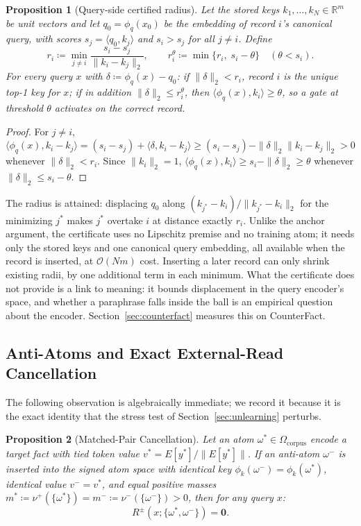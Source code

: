 \documentclass[preprint,12pt]{elsarticle}
\newtheorem{proposition}{Proposition}
\newcommand{\R}{\mathbb{R}}
\newcommand{\Om}{\Omega}
\newif\ifmarkchanges
\newcommand{\rev}[1]{\ifmarkchanges{\color{blue}#1}\else#1\fi}
\begin{document}
\begin{proposition}[Query-side certified radius]
\label{prop:query_radius}
\rev{Let the stored keys $k_1,\dots,k_N\in\R^m$ be unit vectors and let $q_0=\phi_q(x_0)$ be the embedding of record $i$'s canonical query, with scores $s_j=\langle q_0,k_j\rangle$ and $s_i>s_j$ for all $j\ne i$. Define
\[
  r_i \coloneqq \min_{j\ne i}\frac{s_i-s_j}{\|k_i-k_j\|_2}, \qquad r_i^{\theta}\coloneqq\min\{r_i,\; s_i-\theta\}\quad(\theta<s_i).
\]
For every query $x$ with $\delta\coloneqq\phi_q(x)-q_0$: if $\|\delta\|_2<r_i$, record $i$ is the unique top-1 key for $x$; if in addition $\|\delta\|_2\le r_i^{\theta}$, then $\langle\phi_q(x),k_i\rangle\ge\theta$, so a gate at threshold $\theta$ activates on the correct record.}
\end{proposition}

\begin{proof}
\rev{For $j\ne i$, $\langle\phi_q(x),k_i-k_j\rangle=(s_i-s_j)+\langle\delta,k_i-k_j\rangle\ge(s_i-s_j)-\|\delta\|_2\|k_i-k_j\|_2>0$ whenever $\|\delta\|_2<r_i$. Since $\|k_i\|_2=1$, $\langle\phi_q(x),k_i\rangle\ge s_i-\|\delta\|_2\ge\theta$ whenever $\|\delta\|_2\le s_i-\theta$.} \qedhere
\end{proof}

\rev{The radius is attained: displacing $q_0$ along $(k_{j^*}-k_i)/\|k_{j^*}-k_i\|_2$ for the minimizing $j^*$ makes $j^*$ overtake $i$ at distance exactly $r_i$. Unlike the anchor argument, the certificate uses no Lipschitz premise and no training atom; it needs only the stored keys and one canonical query embedding, all available when the record is inserted, at $\mathcal O(Nm)$ cost. Inserting a later record can only shrink existing radii, by one additional term in each minimum. What the certificate does not provide is a link to meaning: it bounds displacement in the query encoder's space, and whether a paraphrase falls inside the ball is an empirical question about the encoder. Section~\ref{sec:counterfact} measures this on CounterFact.}

\subsection{Anti-Atoms and Exact External-Read Cancellation}

The following observation is algebraically immediate; we record it because it is the exact identity that the stress test of Section~\ref{sec:unlearning} perturbs.

\begin{proposition}[Matched-Pair Cancellation]
\label{prop:unlearning}
Let an atom $\omega^* \in \Om_{\mathrm{corpus}}$ encode a target fact with tied token value $v^* = E[y^*] / \|E[y^*]\|$. If an anti-atom $\omega^-$ is inserted into the signed atom space with identical key $\phi_k(\omega^-) = \phi_k(\omega^*)$, identical value $v^- = v^*$, and equal positive masses $m^* \coloneqq \nu^+(\{\omega^*\}) = m^- \coloneqq \nu^-(\{\omega^-\}) > 0$, then for any query $x$:
\[
  R^{\pm}(x; \{\omega^*, \omega^-\}) = \mathbf{0}.
\]
\end{proposition}
\end{document}
